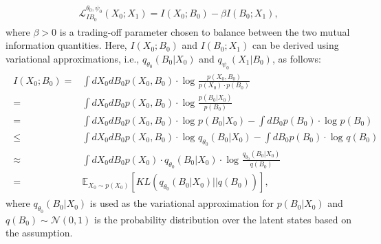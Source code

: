 \begin{align}
\begin{aligned}
\mathcal{L}_{IB_{0}}^{\theta _{0},\psi _{0} } \left ( X_{0}; X_{1} \right ) = I\left ( X_{0}; B_{0} \right )-\beta I\left ( B_{0}; X_{1} \right ),
\end{aligned}
\label{appeq1_IB}
\end{align}
where $\beta > 0$ is a trading-off parameter chosen to balance between the two mutual information quantities. Here, $I\left ( X_{0}; B_{0} \right )$ and $I\left ( B_{0}; X_{1} \right )$ can be derived using variational approximations, i.e., $q_{\theta _{0}}\left ( B_{0}|X_{0} \right )$ and $q_{\psi _{0}}\left ( X_{1}|B_{0} \right )$, as follows:
\begin{align}
\begin{aligned}
I\left ( X_{0}; B_{0} \right ) =& \int dX_{0}dB_{0} p\left (X_{0},B_{0} \right )\cdot \log_{}{\frac{p\left (X_{0},B_{0} \right )}{p\left (X_{0}\right )\cdot p\left (B_{0}\right )} } \\=& \int dX_{0}dB_{0} p\left (X_{0},B_{0} \right )\cdot \log_{}{\frac{p\left (B_{0}|X_{0} \right )}{ p\left (B_{0}\right )} }\\=
&\int dX_{0}dB_{0} p\left (X_{0},B_{0} \right )\cdot \log_{}{p\left (B_{0}|X_{0} \right )} - \int dB_{0} p\left (B_{0} \right )\cdot \log_{}{p\left (B_{0}\right )}  \\\leq & \int dX_{0}dB_{0} p\left (X_{0},B_{0} \right )\cdot \log_{}{q_{\theta _{0} } \left (B_{0}|X_{0} \right )} - \int dB_{0} p\left (B_{0} \right )\cdot \log_{}{q\left (B_{0}\right )}\\\approx  & \int dX_{0}dB_{0} p\left ( X_{0}  \right )\cdot q_{\theta _{0} } \left ( B_{0}|X_{0} \right )\cdot \log_{}{\frac{q_{\theta _{0} } \left (B_{0}|X_{0} \right )}{ q\left (B_{0}\right )} }\\=& \mathbb{E} _{X_0\sim p\left ( X_0 \right ) } \left [ KL\left ( q_{\theta _{0} } \left ( B_0|X_0 \right )||q\left ( B_0 \right )   \right )  \right ], 
\end{aligned}
\label{lossfunc1}
\end{align}
where $q_{\theta _{0} } \left ( B_{0}|X_{0}\right )$ is used as the variational approximation for $p\left ( B_{0}|X_{0}\right )$ and $q \left ( B_{0}\right )\sim \mathcal{N} \left ( 0,1 \right ) $ is the probability distribution over the latent states based on the assumption.
